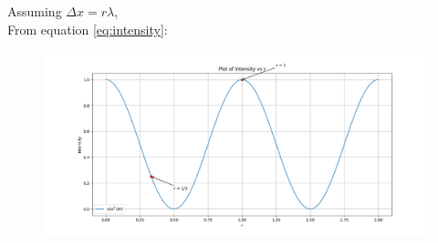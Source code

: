 \documentclass[journal,12pt,twocolumn]{IEEEtran}
\theoremstyle{remark}
\begin{document}
\begin{table}[htbp]
\centering

\vspace{0.2cm}
\caption{}
\label{tab:parameters1}
\end{table}
Assuming $\Delta x= r\lambda$,  \\
\phantom{as}From equation \eqref{eq:intensity}:
\begin{figure}[htbp]
    \centering
    \includegraphics[width = \columnwidth]{figs/Intensity plot.png}
  \caption{}
    \label{fig:graph1}
\end{figure}

\end{document}
